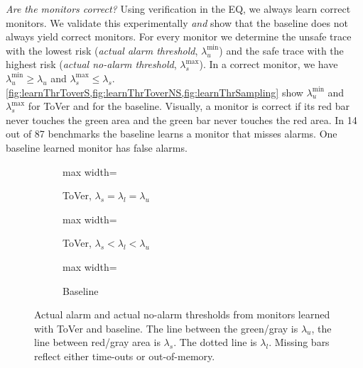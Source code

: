\documentclass[runningheads]{llncs}
\renewcommand{\paragraph}[1]{\smallskip\noindent\emph{#1}}
\newcommand{\alg}{ToVer\xspace}
\begin{document}
\paragraph{Are the monitors correct?}
Using verification in the EQ, we always learn correct monitors. We validate this experimentally \emph{and} show that the baseline does not always yield correct monitors. For every monitor we determine the unsafe trace with the lowest risk (\emph{actual alarm threshold}, $\lambda_u^{\min}$) and the safe trace with the highest risk (\emph{actual no-alarm threshold}, $\lambda_s^{\max}$). In a correct monitor, we have $\lambda_u^{\min} \geq \lambda_u$ and $\lambda_s^{\max} \leq \lambda_s$.
\cref{fig:learnThrToverS,fig:learnThrToverNS,fig:learnThrSampling} show $\lambda_u^{\min}$ and $\lambda_s^{\max}$ for \alg and for the baseline. Visually, a monitor is correct if its red bar never touches the green area and the green bar never touches the red area. In 14 out of 87 benchmarks the baseline learns a monitor that misses alarms. One baseline learned monitor has false alarms.

\begin{figure}[t]
    \begin{subfigure}{.51\linewidth}
        \begin{adjustbox}{max width=\linewidth}
            
        \end{adjustbox}
        \caption{\alg, $\lambda_s=\lambda_l=\lambda_u$}
        \label{fig:learnThrToverNS}
    \end{subfigure}\hfill
    \begin{subfigure}{.47\linewidth}
        \begin{adjustbox}{max width=\linewidth}
            
        \end{adjustbox}
        \caption{\alg, $\lambda_s < \lambda_l < \lambda_u$}
        \label{fig:learnThrToverS}
    \end{subfigure}\hfill
    \centering
    \begin{subfigure}{.47\linewidth}
        \begin{adjustbox}{max width=\linewidth}
            
        \end{adjustbox}
        \caption{Baseline}
        \label{fig:learnThrSampling}
    \end{subfigure}
    \caption{Actual alarm and actual no-alarm thresholds from monitors learned with \alg and baseline. The line between the green/gray is $\lambda_u$, the line between red/gray area is $\lambda_s$. The dotted line is $\lambda_l$. Missing bars reflect either time-outs or out-of-memory.}
\end{figure}
\end{document}

